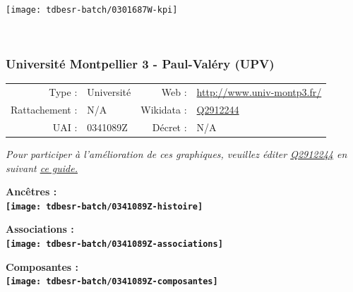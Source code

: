 \documentclass[12pt,french,]{article}
\begin{document}
\begin{center}\texttt{[image: tdbesr-batch/0301687W-kpi]} \end{center}\checkoddpage

\ifoddpage \fi ~\newpage  

\hypertarget{universituxe9-montpellier-3---paul-valuxe9ry-upv}{%
\subsubsection{Université Montpellier 3 - Paul-Valéry
(UPV)}\label{universituxe9-montpellier-3---paul-valuxe9ry-upv}}

\begin{tabular*}{\textwidth}{rp{5cm}rl}  
\hline  
Type : & Université & Web : &\href{http://www.univ-montp3.fr/}{http://www.univ-montp3.fr/} \\  
Rattachement : & N/A & Wikidata : & \href{https://www.wikidata.org/entity/Q2912244}{Q2912244} \\  
UAI : & 0341089Z & Décret : & N/A \\  
\hline  
\end{tabular*}

\textit{\scriptsize Pour participer à l'amélioration de ces graphiques, veuillez éditer  \href{https://www.wikidata.org/entity/Q2912244}{Q2912244}  en suivant \href{https://github.com/cpesr/wikidataESR/blob/master/Rmd/wikidataESR.md}{ce guide.}}

\vspace{1cm}  
\begin{minipage}[b]{0.50\textwidth}\begin{center} \bf Ancêtres : \\  
\texttt{[image: tdbesr-batch/0341089Z-histoire]} \end{center}\end{minipage}\begin{minipage}[b]{0.50\textwidth}\begin{center} \bf Associations : \\  
\texttt{[image: tdbesr-batch/0341089Z-associations]} \end{center}\end{minipage}

\hrulefill

\begin{center} \bf Composantes : \\  
\texttt{[image: tdbesr-batch/0341089Z-composantes]} \end{center}
\end{document}
